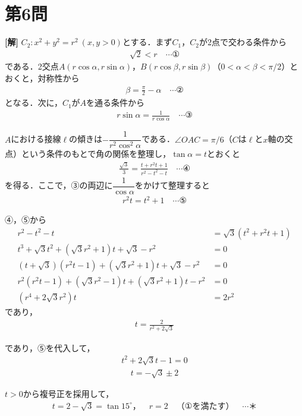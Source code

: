 \documentclass[../main.tex]{subfiles}
\begin{document}
\newpage

\section*{第6問}

{\bf [解]}
$C_2:x^2+y^2=r^2\ (x,y>0)$とする．まず$C_1$，$C_2$が2点で交わる条件から
\begin{align*}
  \sqrt2<r\quad\cdots①
\end{align*}
である．2交点$A(r\cos\alpha,r\sin\alpha)$，$B(r\cos\beta,r\sin\beta)$（$0<\alpha<\beta<\pi/2$）とおくと，対称性から
\begin{align*}
  \beta=\frac\pi2-\alpha\quad\cdots②
\end{align*}
となる．次に，$C_1$が$A$を通る条件から
\begin{align*}
  r\sin\alpha=\frac{1}{r\cos\alpha}\quad\cdots③
\end{align*}

$A$における接線$\ell$の傾きは$-\dfrac{1}{r^2\cos^2\alpha}$である．$\angle OAC=\pi/6$（$C$は$\ell$と$x$軸の交点）という条件のもとで角の関係を整理し，$\tan\alpha=t$とおくと
\begin{align*}
  \frac{\sqrt3}{3}=\frac{t+r^2t+1}{r^2-t^2-t}\quad\cdots④
\end{align*}
を得る．ここで，③の両辺に$\dfrac{1}{\cos\alpha}$をかけて整理すると
\begin{align*}
  r^2t=t^2+1\quad\cdots⑤
\end{align*}

④，⑤から
\begin{align*}
  r^2-t^2-t&=\sqrt3(t^2+r^2t+1)\\
  t^3+\sqrt3t^2+(\sqrt3r^2+1)t+\sqrt3-r^2&=0\\
  (t+\sqrt3)(r^2t-1)+(\sqrt3r^2+1)t+\sqrt3-r^2&=0\\
  r^2(r^2t-1)+(\sqrt3r^2-1)t+(\sqrt3r^2+1)t-r^2&=0\\
  (r^4+2\sqrt3r^2)t&=2r^2
\end{align*}
であり，
\begin{align*}
  t=\frac{2}{r^2+2\sqrt3}
\end{align*}

であり，⑤を代入して，
\begin{align*}
  t^2+2\sqrt3t-1=0
\end{align*}
\begin{align*}
  t=-\sqrt3\pm2
\end{align*}

$t>0$から複号正を採用して，
\begin{align*}
  t=2-\sqrt3=\tan15^\circ，\quad r=2\quad（①を満たす）\quad\cdots\text{＊}
\end{align*}
\end{document}
